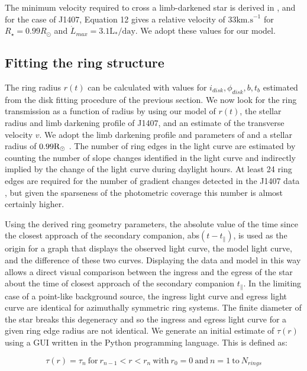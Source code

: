 \documentclass{emulateapj}
\newcommand{\tp}{t_\parallel}
\newcommand{\id}{i_{disk}}
\newcommand{\pd}{\phi_{disk}}
\newcommand{\taur}{\tau(r)}
\begin{document}
\capstarttrue

The minimum velocity required to cross a limb-darkened star is derived
in \citet{vanWerkhoven14}, and for the case of J1407, Equation 12 gives
a relative velocity of $33\mathrm{km.s}^{-1}$ for $R_\star=0.99 R_\odot$
and $\dot{L}_{max}=3.1 \mathrm{L}_*/\mathrm{day}$.
We adopt these values for our model.

\subsection{Fitting the ring structure}
\label{sec:ringfit}

The ring radius $r(t)$ can be calculated with values for $\id,\pd,b,t_b$
estimated from the disk fitting procedure of the previous section.
We now look for the ring transmission as a function of radius
by using our model of $r(t)$, the stellar radius and limb darkening
profile of J1407, and an estimate of the transverse velocity $v$.
We adopt the limb darkening profile and parameters of
\citet{vanWerkhoven14} and a stellar radius of $0.99{\rm R}_\odot$
\citep{Kenworthy15}.
The number of ring edges in the light curve are estimated by counting
the number of slope changes identified in the light curve and
indirectly implied by the change of the light curve during daylight
hours.
At least 24 ring edges are required for the number of gradient changes
detected in the J1407 data \citep{vanWerkhoven14}, but given the
sparseness of the photometric coverage this number is almost certainly
higher.

Using the derived ring geometry parameters, the absolute value of the
time since the closest approach of the secondary companion,
abs$(t-\tp)$, is used as the origin for a graph that displays the
observed light curve, the model light curve, and the difference of these
two curves.
Displaying the data and model in this way allows a direct visual
comparison between the ingress and the egress of the star about the time
of closest approach of the secondary companion $\tp$.
In the limiting case of a point-like background source, the ingress
light curve and egress light curve are identical for azimuthally
symmetric ring systems.
The finite diameter of the star breaks this degeneracy and so the
ingress and egress light curve for a given ring edge radius are not
identical.
We generate an initial estimate of $\taur$ using a GUI written in the
Python programming language.
This is defined as:

\begin{equation} \label{eq:ring} \taur = \tau_n \mathrm{\ for\ } r_{n-1}
< r < r_n \mathrm{\ with\ } r_0=0 \mathrm{\ and\ }n =
1\mathrm{\ to\ }N_{rings} \end{equation}
\end{document}
